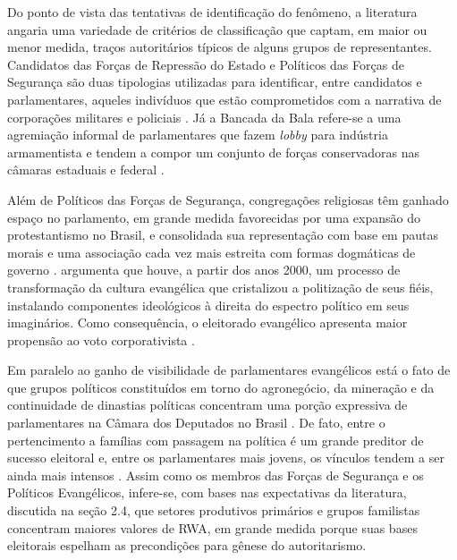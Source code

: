 \documentclass[
12pt,				%
openright,			%
twoside,			%
a4paper,			%
english,			%
french,				%
spanish,			%
brazil				%
]{abntex2}
\begin{document}
Do ponto de vista das tentativas de identificação do fenômeno, a literatura angaria uma variedade de critérios de classificação que captam, em maior ou menor medida, traços autoritários típicos de alguns grupos de representantes. Candidatos das Forças de Repressão do Estado e Políticos das Forças de Segurança são duas tipologias utilizadas para identificar, entre candidatos e parlamentares, aqueles indivíduos que estão comprometidos com a narrativa de corporações militares e policiais \cite{berlatto2015candidatos,berlatto2016policia}. Já a Bancada da Bala refere-se a uma agremiação informal de parlamentares que fazem \textit{lobby} para indústria armamentista e tendem a compor um conjunto de forças conservadoras nas câmaras estaduais e federal \cite{faganellobancada,faganello2017voto}.

Além de Políticos das Forças de Segurança, congregações religiosas têm ganhado espaço no parlamento, em grande medida favorecidas por uma expansão do protestantismo no Brasil, e consolidada sua representação com base em pautas morais e uma associação cada vez mais estreita com formas dogmáticas de governo \cite{codato2015nova, do2016religiao}.  argumenta que houve, a partir dos anos 2000, um processo de transformação da cultura evangélica que cristalizou a politização de seus fiéis, instalando componentes ideológicos à direita do espectro político em seus imaginários. Como consequência, o eleitorado evangélico apresenta maior propensão ao voto corporativista \cite{netto2017dinheiro}. 

Em paralelo ao ganho de visibilidade de parlamentares evangélicos está o fato de que grupos políticos constituídos em torno do agronegócio, da mineração e da continuidade de dinastias políticas concentram uma porção expressiva de parlamentares na Câmara dos Deputados no Brasil \cite{congresso2016bancadas}. De fato, entre o pertencimento a famílias com passagem na política é um grande preditor de sucesso eleitoral e, entre os parlamentares mais jovens, os vínculos tendem a ser ainda mais intensos \cite{de2016familias}. Assim como os membros das Forças de Segurança e os Políticos Evangélicos, infere-se, com bases nas expectativas da literatura, discutida na seção 2.4, que setores produtivos primários e grupos familistas concentram maiores valores de RWA, em grande medida porque suas bases eleitorais espelham as precondições para gênese do autoritarismo. 
\end{document}
